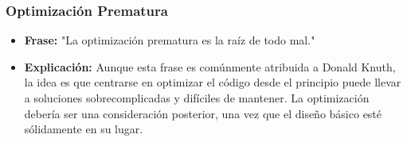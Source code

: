\documentclass{beamer}
\begin{document}
\begin{frame}
	\frametitle{Optimización Prematura}
	\begin{itemize}
		\item \textbf{Frase:} "La optimización prematura es la raíz de todo mal."
		\item \textbf{Explicación:} Aunque esta frase es comúnmente atribuida a Donald Knuth, la idea es que centrarse en optimizar el código desde el principio puede llevar a soluciones sobrecomplicadas y difíciles de mantener. La optimización debería ser una consideración posterior, una vez que el diseño básico esté sólidamente en su lugar.
	\end{itemize}
\end{frame}
\end{document}
